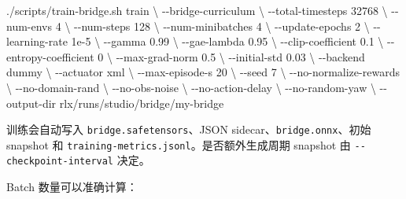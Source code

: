 \documentclass[
  chinese,
  11pt,
  letterpaper,
]{article}
\newenvironment{Shaded}{\begin{snugshade}}{\end{snugshade}}
\newcommand{\AttributeTok}[1]{\textcolor[rgb]{0.13,0.29,0.53}{#1}}
\newcommand{\DataTypeTok}[1]{\textcolor[rgb]{0.13,0.29,0.53}{#1}}
\newcommand{\ExtensionTok}[1]{#1}
\newcommand{\NormalTok}[1]{#1}
\renewenvironment{Shaded}{\par\smallskip}{\par\smallskip}
\begin{document}
\begin{Shaded}
\begin{Highlighting}[]
\ExtensionTok{./scripts/train{-}bridge.sh}\NormalTok{ train }\DataTypeTok{\textbackslash{}}
  \AttributeTok{{-}{-}bridge{-}curriculum} \DataTypeTok{\textbackslash{}}
  \AttributeTok{{-}{-}total{-}timesteps}\NormalTok{ 32768 }\DataTypeTok{\textbackslash{}}
  \AttributeTok{{-}{-}num{-}envs}\NormalTok{ 4 }\DataTypeTok{\textbackslash{}}
  \AttributeTok{{-}{-}num{-}steps}\NormalTok{ 128 }\DataTypeTok{\textbackslash{}}
  \AttributeTok{{-}{-}num{-}minibatches}\NormalTok{ 4 }\DataTypeTok{\textbackslash{}}
  \AttributeTok{{-}{-}update{-}epochs}\NormalTok{ 2 }\DataTypeTok{\textbackslash{}}
  \AttributeTok{{-}{-}learning{-}rate}\NormalTok{ 1e{-}5 }\DataTypeTok{\textbackslash{}}
  \AttributeTok{{-}{-}gamma}\NormalTok{ 0.99 }\DataTypeTok{\textbackslash{}}
  \AttributeTok{{-}{-}gae{-}lambda}\NormalTok{ 0.95 }\DataTypeTok{\textbackslash{}}
  \AttributeTok{{-}{-}clip{-}coefficient}\NormalTok{ 0.1 }\DataTypeTok{\textbackslash{}}
  \AttributeTok{{-}{-}entropy{-}coefficient}\NormalTok{ 0 }\DataTypeTok{\textbackslash{}}
  \AttributeTok{{-}{-}max{-}grad{-}norm}\NormalTok{ 0.5 }\DataTypeTok{\textbackslash{}}
  \AttributeTok{{-}{-}initial{-}std}\NormalTok{ 0.03 }\DataTypeTok{\textbackslash{}}
  \AttributeTok{{-}{-}backend}\NormalTok{ dummy }\DataTypeTok{\textbackslash{}}
  \AttributeTok{{-}{-}actuator}\NormalTok{ xml }\DataTypeTok{\textbackslash{}}
  \AttributeTok{{-}{-}max{-}episode{-}s}\NormalTok{ 20 }\DataTypeTok{\textbackslash{}}
  \AttributeTok{{-}{-}seed}\NormalTok{ 7 }\DataTypeTok{\textbackslash{}}
  \AttributeTok{{-}{-}no{-}normalize{-}rewards} \DataTypeTok{\textbackslash{}}
  \AttributeTok{{-}{-}no{-}domain{-}rand} \DataTypeTok{\textbackslash{}}
  \AttributeTok{{-}{-}no{-}obs{-}noise} \DataTypeTok{\textbackslash{}}
  \AttributeTok{{-}{-}no{-}action{-}delay} \DataTypeTok{\textbackslash{}}
  \AttributeTok{{-}{-}no{-}random{-}yaw} \DataTypeTok{\textbackslash{}}
  \AttributeTok{{-}{-}output{-}dir}\NormalTok{ rlx/runs/studio/bridge/my{-}bridge}
\end{Highlighting}
\end{Shaded}

训练会自动写入
\texttt{bridge.s\allowbreak{}afetenso\allowbreak{}rs}、JSON
sidecar、\texttt{bridge.onnx}、初始 snapshot 和
\texttt{training\allowbreak{}-\allowbreak{}metrics.\allowbreak{}jsonl}。是否额外生成周期
snapshot 由
\texttt{-\allowbreak{}-\allowbreak{}checkpoi\allowbreak{}nt-\allowbreak{}interval\allowbreak{}}
决定。

Batch 数量可以准确计算：
\end{document}
